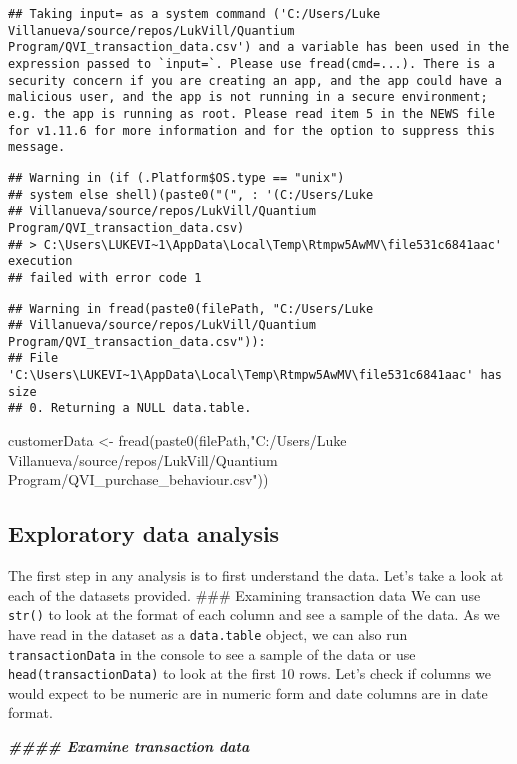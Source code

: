 \documentclass[
]{article}
\newenvironment{Shaded}{\begin{snugshade}}{\end{snugshade}}
\newcommand{\DocumentationTok}[1]{\textcolor[rgb]{0.56,0.35,0.01}{\textbf{\textit{#1}}}}
\newcommand{\FunctionTok}[1]{\textcolor[rgb]{0.00,0.00,0.00}{#1}}
\newcommand{\NormalTok}[1]{#1}
\newcommand{\OtherTok}[1]{\textcolor[rgb]{0.56,0.35,0.01}{#1}}
\newcommand{\StringTok}[1]{\textcolor[rgb]{0.31,0.60,0.02}{#1}}
\begin{document}
\begin{verbatim}
## Taking input= as a system command ('C:/Users/Luke Villanueva/source/repos/LukVill/Quantium Program/QVI_transaction_data.csv') and a variable has been used in the expression passed to `input=`. Please use fread(cmd=...). There is a security concern if you are creating an app, and the app could have a malicious user, and the app is not running in a secure environment; e.g. the app is running as root. Please read item 5 in the NEWS file for v1.11.6 for more information and for the option to suppress this message.
\end{verbatim}

\begin{verbatim}
## Warning in (if (.Platform$OS.type == "unix")
## system else shell)(paste0("(", : '(C:/Users/Luke
## Villanueva/source/repos/LukVill/Quantium Program/QVI_transaction_data.csv)
## > C:\Users\LUKEVI~1\AppData\Local\Temp\Rtmpw5AwMV\file531c6841aac' execution
## failed with error code 1
\end{verbatim}

\begin{verbatim}
## Warning in fread(paste0(filePath, "C:/Users/Luke
## Villanueva/source/repos/LukVill/Quantium Program/QVI_transaction_data.csv")):
## File 'C:\Users\LUKEVI~1\AppData\Local\Temp\Rtmpw5AwMV\file531c6841aac' has size
## 0. Returning a NULL data.table.
\end{verbatim}

\begin{Shaded}
\begin{Highlighting}[]
\NormalTok{customerData }\OtherTok{\textless{}{-}} \FunctionTok{fread}\NormalTok{(}\FunctionTok{paste0}\NormalTok{(filePath,}\StringTok{"C:/Users/Luke Villanueva/source/repos/LukVill/Quantium Program/QVI\_purchase\_behaviour.csv"}\NormalTok{))}
\end{Highlighting}
\end{Shaded}

\hypertarget{exploratory-data-analysis}{%
\subsection{Exploratory data analysis}\label{exploratory-data-analysis}}

The first step in any analysis is to first understand the data. Let's
take a look at each of the datasets provided. \#\#\# Examining
transaction data We can use \texttt{str()} to look at the format of each
column and see a sample of the data. As we have read in the dataset as a
\texttt{data.table} object, we can also run \texttt{transactionData} in
the console to see a sample of the data or use
\texttt{head(transactionData)} to look at the first 10 rows. Let's check
if columns we would expect to be numeric are in numeric form and date
columns are in date format.

\begin{Shaded}
\begin{Highlighting}[]
\DocumentationTok{\#\#\#\# Examine transaction data}
\end{Highlighting}
\end{Shaded}
\end{document}
